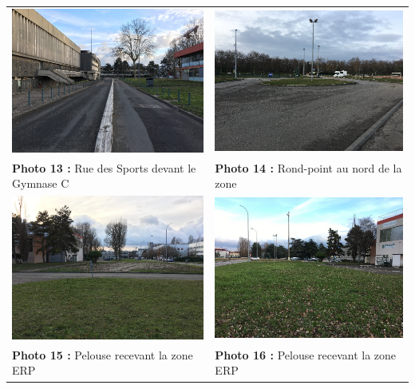 \documentclass[hidelinks, paper=a4, fontsize=13pt]{report}
\begin{document}
\begin{center}
\begin{tabular}{ll}
\includegraphics[width=.45\textwidth]{Annexes/Exports/Photo_13} & \includegraphics[width=.45\textwidth]{Annexes/Exports/Photo_14} \\
\textbf{Photo 13 :} Rue des Sports devant le Gymnase C & \textbf{Photo 14 :} Rond-point au nord de la zone
\vspace{0.2 cm}\\
\includegraphics[width=.45\textwidth]{Annexes/Exports/Photo_15} & \includegraphics[width=.45\textwidth]{Annexes/Exports/Photo_16} \\
\textbf{Photo 15 :} Pelouse recevant la zone ERP & \textbf{Photo 16 :} Pelouse recevant la zone ERP

\end{tabular}
\end{center}
\end{document}
